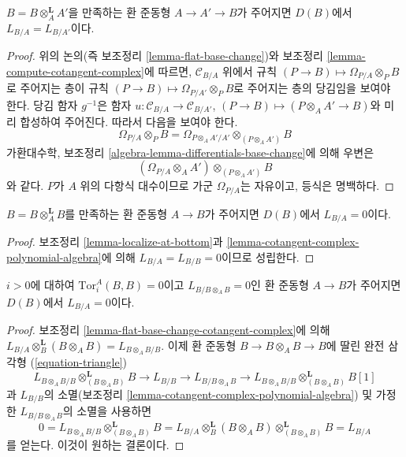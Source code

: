 \begin{lemma}
\label{lemma-localize-at-bottom}
$B=B\otimes_A^\mathbf{L}A'$을 만족하는 환 준동형
$A\to A'\to B$가 주어지면 $D(B)$에서 $L_{B/A}=L_{B/A'}$이다.
\end{lemma}

\begin{proof}
위의 논의(즉 보조정리 \ref{lemma-flat-base-change})와 보조정리
\ref{lemma-compute-cotangent-complex}에 따르면,
$\mathcal{C}_{B/A}$ 위에서 규칙
$(P\to B)\mapsto\Omega_{P/A}\otimes_PB$로 주어지는 층이 규칙
$(P\to B)\mapsto\Omega_{P/A'}\otimes_PB$로 주어지는 층의 당김임을
보여야 한다. 당김 함자 $g^{-1}$은 함자
$u:\mathcal{C}_{B/A}\to\mathcal{C}_{B/A'}$,
$(P\to B)\mapsto(P\otimes_AA'\to B)$와 미리 합성하여 주어진다. 따라서
다음을 보여야 한다.
$$
\Omega_{P/A} \otimes_P B =
\Omega_{P \otimes_A A'/A'} \otimes_{(P \otimes_A A')} B
$$
가환대수학, 보조정리 \ref{algebra-lemma-differentials-base-change}에 의해
우변은
$$
(\Omega_{P/A} \otimes_A A') \otimes_{(P \otimes_A A')} B
$$
와 같다. $P$가 $A$ 위의 다항식 대수이므로 가군 $\Omega_{P/A}$는
자유이고, 등식은 명백하다.
\end{proof}

\begin{lemma}
\label{lemma-derived-diagonal}
$B=B\otimes_A^\mathbf{L}B$를 만족하는 환 준동형 $A\to B$가 주어지면
$D(B)$에서 $L_{B/A}=0$이다.
\end{lemma}

\begin{proof}
보조정리 \ref{lemma-localize-at-bottom}과
\ref{lemma-cotangent-complex-polynomial-algebra}에 의해
$L_{B/A}=L_{B/B}=0$이므로 성립한다.
\end{proof}

\begin{lemma}
\label{lemma-bootstrap}
$i>0$에 대하여 $\text{Tor}^A_i(B,B)=0$이고
$L_{B/B\otimes_AB}=0$인 환 준동형 $A\to B$가 주어지면 $D(B)$에서
$L_{B/A}=0$이다.
\end{lemma}

\begin{proof}
보조정리 \ref{lemma-flat-base-change-cotangent-complex}에 의해
$L_{B/A} \otimes_B^\mathbf{L} (B \otimes_A B) = L_{B \otimes_A B/B}$.
이제 환 준동형 $B\to B\otimes_AB\to B$에 딸린 완전 삼각형
(\ref{equation-triangle})
$$
L_{B \otimes_A B/B} \otimes^\mathbf{L}_{(B \otimes_A B)} B \to
L_{B/B} \to L_{B/B \otimes_A B} \to
L_{B \otimes_A B/B} \otimes^\mathbf{L}_{(B \otimes_A B)} B[1]
$$
과 $L_{B/B}$의 소멸(보조정리
\ref{lemma-cotangent-complex-polynomial-algebra}) 및 가정한
$L_{B/B\otimes_AB}$의 소멸을 사용하면
$$
0 =
L_{B \otimes_A B/B} \otimes^\mathbf{L}_{(B \otimes_A B)} B =
L_{B/A} \otimes_B^\mathbf{L} (B \otimes_A B)
\otimes^\mathbf{L}_{(B \otimes_A B)} B = L_{B/A}
$$
를 얻는다. 이것이 원하는 결론이다.
\end{proof}

